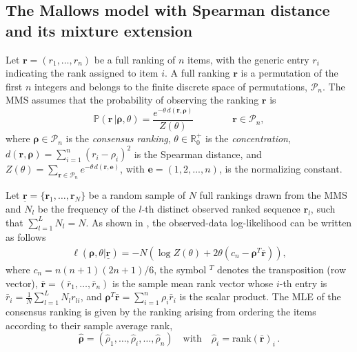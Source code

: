 \subsection{The Mallows model with Spearman distance and its mixture extension}
\label{ssec:inference_complete}

Let $\bm{r}=(r_1,\dots,r_n)$ be a full ranking of $n$ items, with the generic entry $r_i$ indicating the rank assigned to item $i$. A full ranking $\bm{r}$ is a permutation of the first $n$ integers and belongs to the finite discrete space of permutations, $\mathcal{P}_n$.
The MMS assumes that the probability of observing the ranking $\bm{r}$ is
 \begin{equation*}
 \label{eq:MM}
\mathbb{P}(\bm{r}\,\vert \bm{\rho},\theta)
=\frac{e^{-\theta\, d(\bm{r},\bm\rho)}}{Z(\theta)}
\qquad\qquad\bm{r}\in\mathcal{P}_n,
\end{equation*}
where $\bm\rho\in\mathcal{P}_n$ is the \textit{consensus ranking}, $\theta\in\mathbb{R}_0^+$ is the \textit{concentration}, $d(\bm{r},\bm\rho)=\sum_{i=1}^n(r_i-\rho_i)^2$ is the Spearman distance, and $Z(\theta)=\sum_{\bm{r} \in \mathcal{P}_{n}} e^{-\theta\, d(\bm{r},\bm e)}$, with $\bm e=(1, 2, ..., n)$, is the normalizing constant.

Let $\underline{\bm{r}}=\{\bm{r}_1,\dots,\bm{r}_N\}$ be a random sample of $N$ full rankings drawn from the MMS and $N_l$ be the frequency of the $l$-th distinct observed ranked sequence $\bm{r}_l$,
such that $\sum_{l=1}^L N_l=N$. As shown in \cite{crispino23efficient}, the observed-data log-likelihood can be written as follows
\begin{equation*}
\begin{split}
\ell(\bm{\rho},\theta\vert\underline{\bm{r}})
=-N\left(\log{Z(\theta)}+2\theta\left(c_n-\bm{\rho}^T{\bm{\bar r}}\right)\right),
\end{split}
\end{equation*}
where $c_n=n(n+1)(2n+1)/6$, the symbol $^T$ denotes the transposition (row vector),  ${\bm{\bar r}}=(\bar{r}_1,\ldots,\bar{r}_n)$ is the sample mean rank vector whose $i$-th entry is $\bar{r}_i=\frac{1}{N}\sum_{l=1}^LN_lr_{li}$, and $\bm{\rho}^T{\bm{\bar r}}=\sum_{i=1}^n\rho_i\bar{r}_i$ is the scalar product. The MLE of the consensus ranking is given by the
ranking arising from ordering the items according to their sample average rank,
\begin{equation*}
    \hat{\bm{\rho}}=(\hat\rho_1,\ldots,\hat\rho_i,\ldots,\hat\rho_n)\quad\text{with}\quad\hat\rho_i=\text{rank}(\bar{\bm r})_i \,.
\end{equation*}

